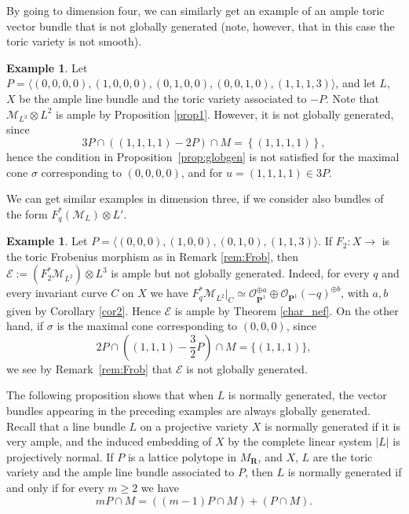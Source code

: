 \documentclass[12pt]{amsart}
\theoremstyle{definition}
\newtheorem{example}[lemma]{Example}
\theoremstyle{remark}
\begin{document}
By going to dimension four, we can similarly get an example of an ample
toric vector bundle that is not globally generated (note, however, that in this case the
toric variety is not smooth).

\begin{example}\label{example12}
 Let $P= {\langle} (0,0,0,0), (1,0,0,0), (0,1,0,0), (0,0,1,0), 
(1,1,1,3) {\rangle}$,  and let $L$, $X$ be the  ample line bundle
and the toric variety associated to $-P$. Note that ${\mathcal{M}}_{L^3}\otimes L^2$ is ample by 
Proposition \ref{prop1}. However, it is not globally generated, since 
 \[ 3P\cap \left(\left(1,1,1,1\right) -2P\right) \cap M 
= \left\{ \left( 1,1,1,1\right)\right\},\]
hence the condition in Proposition~\ref{prop:globgen} is not satisfied for 
 the 
maximal cone $\sigma$ corresponding to $(0,0,0,0)$, and for 
$u=(1,1,1,1)\in 3P$.
\end{example}

We can get similar examples in dimension three, if we consider
also bundles of the form $F_q^*({\mathcal{M}}_L)\otimes L'$.

\begin{example}\label{example13}
 Let $P={\langle}(0,0,0), (1,0,0), (0,1,0), (1,1,3){\rangle}$.
If $F_2\colon X{\xrightarrow{\ \ }}$ is the toric Frobenius morphism as in Remark \ref{rem:Frob}, 
then ${\mathcal{E}}:=\left(F_2^*{\mathcal{M}}_{L^2}\right)\otimes L^3$ is ample but not 
globally generated. Indeed, for every $q$ and every invariant curve $C$ on $X$
we have  $F^*_q{\mathcal{M}}_{L^2}\vert_C\simeq
{\mathcal{O}}_{{{\mathbf P}}^1}^{\oplus
a}\oplus{\mathcal{O}}_{{{\mathbf P}}^1}(-q)^{\oplus b}$, with $a,b$ given by Corollary
\ref{cor2}. Hence ${\mathcal{E}}$ is ample by Theorem \ref{char_nef}. 
On the other hand, 
 if $\sigma$ is the maximal 
cone corresponding to $(0,0,0)$,
since
$$2P\cap \left((1,1,1)-\frac{3}{2}P\right)\cap M=\{(1,1,1)\},$$
we see by Remark~\ref{rem:Frob} that
${\mathcal{E}}$ is not globally generated. 
\end{example}

The following proposition shows that when $L$ is normally generated, 
the vector bundles appearing in the preceding examples are always globally generated. 
Recall that a line bundle $L$ on a projective variety $X$ is normally generated if it is very ample,
and the induced embedding of $X$ by the complete linear system $|L|$ is projectively normal.
If $P$ is a lattice polytope in $M_{{\mathbf R}}$, and $X$, $L$ are the toric variety and the ample line bundle associated to
 $P$, then $L$ is normally generated if and only if for every $m\geq 2$ we have
 $$mP\cap M=((m-1)P\cap M)+(P\cap M).$$
  
\end{document}
